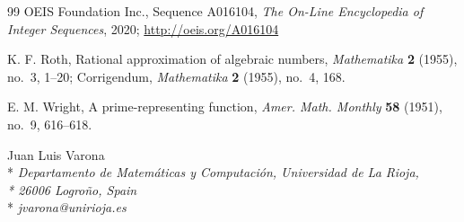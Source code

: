 \documentclass{article}
\theoremstyle{plain}
\begin{document}
\begin{thebibliography}{99}
{OEIS Foundation Inc.},
Sequence A016104, 
\textit{The On-Line Encyclopedia of Integer Sequences}, 2020;
\url{http://oeis.org/A016104}

{K. F. Roth}, 
Rational approximation of algebraic numbers, 
\textit{Mathematika} 
\textbf{2} (1955), no.~3, 1--20; 
Corrigendum, \textit{Mathematika} \textbf{2} (1955), no.~4, 168.


{E. M. Wright}, %
A prime-representing function,
\textit{Amer. Math. Monthly} 
\textbf{58} (1951), no.~9, 616--618.

\end{thebibliography}

\bigskip

\noindent
Juan Luis Varona
\\*
\textit{Departamento de Matem\'aticas y Computaci\'on, Universidad de La Rioja,
\\*
26006 Logro\~no, Spain}
\\*
\textit{jvarona@unirioja.es}

\end{document}
